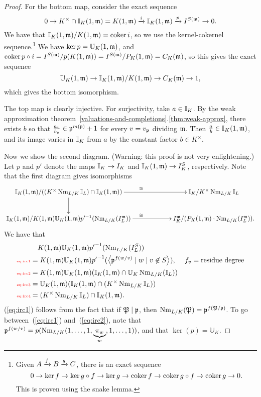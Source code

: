 \begin{proof}
For the bottom map, consider the exact sequence
\[
0\to K^{\times}\cap \mathbb{I}_K(1,{\mathfrak{m}})=K(1,\mathfrak{m})\xrightarrow{i} \mathbb{I}_K(1,{\mathfrak{m}})\xrightarrow{p} I^{S(\mathfrak{m})}\to 0.
\]
We have that $\mathbb{I}_K(1,{\mathfrak{m}})/K(1,\mathfrak{m})=\operatorname{coker} i$, so we use the kernel-cokernel sequence.\footnote{Given $A\xrightarrow{f}B\xrightarrow{g}C$, there is an exact sequence
\[
0\to \ker f\to \ker g\circ f\to \ker g\to \operatorname{coker} f\to \operatorname{coker} g\circ f\to \operatorname{coker} g\to 0.
\]
This is proven using the snake lemma.
}
We have $\ker p=\mathbb U_K(1,\mathfrak{m})$, and $\operatorname{coker} p\circ i=I^{S(\mathfrak{m})}/p(K(1,\mathfrak{m}))=I^{S(\mathfrak{m})}/P_K(1,{\mathfrak{m}})=C_K(\mathfrak{m})$, so this gives the exact sequence  
\[
\mathbb U_K(1,\mathfrak{m})\to  \mathbb{I}_K(1,{\mathfrak{m}})/K(1,{\mathfrak{m}})\to C_K(\mathfrak{m})\to 1,
\]
which gives the bottom isomorphism.

The top map is clearly injective. For surjectivity, take $a\in \mathbb{I}_K$. By the weak approximation theorem~\ref{valuations-and-completions}.\ref{thm:weak-approx}, there exists $b$ so that $\frac{a_v}{b_v}\in \mathfrak{p}^{m(\mathfrak{p})}+1$ for every $v=v_{\mathfrak{p}}$ dividing $\mathfrak{m}$. Then $\frac{a}{b}\in \mathbb{I}_K(1,{\mathfrak{m}})$, and its image varies in $\mathbb{I}_K$ from $a$ by the constant factor $b\in K^{\times}$.

Now we show the second diagram. (Warning: this proof is not very enlightening.) Let $p$ and $p'$ denote the maps $\mathbb{I}_K\to I_K$ and $\mathbb{I}_K(1,\mathfrak{m})\to I_K^S$, respectively. Note that the first diagram gives isomorphisms
\[
\xymatrixcolsep{5pc}
\xymatrix{
\I_K(1,{\mm})/((K^{\times}\nm_{L/K}\I_L)\cap \I_K(1,\mm)) \ar[r]^{\cong} \ar[d]& \I_K/K^{\times}\nm_{L/K}\I_L\\
\I_K(1,{\mm})/
K(1,\mm)\mathbb U_K(1,\mm)
p'^{-1}(\nm_{L/K}(I_L^{\mm}))\ar[r]^{\cong} & I_K^{\mm}/(P_{K}(1,\mm)\cdot \nm_{L/K}(I_L^{\mm})).
}
\]
We have that
\begin{align}
\noindent
&\quad
K(1,{\mm})\mathbb U_K(1,{\mm}){p'}^{-1}(\nm_{L/K}(I_L^{S}))\\
\llabel{eq:irc1}&=
K(1,{\mm})\mathbb U_K(1,{\mm}){p'}^{-1}(\an{\mfp^{f(w/v)}\mid w\mid v\nin S}),&f_v=\text{residue degree}\\
\llabel{eq:irc2}
&=
K(1,{\mm}) \mathbb U_K(1,{\mm})(\I_K(1,{\mm})\cap \mathbb U_K\nm_{L/K}(\I_L))\\
\llabel{eq:irc3}
&=
\mathbb U_K(1,\mm)( \I_K(1,{\mm})\cap(K^{\times}\nm_{L/K}\I_L))\\
\llabel{eq:irc4}
&=
(K^{\times}\nm_{L/K}\I_L)\cap \I_K(1,{\mm}).
\end{align}
(\ref{eq:irc1}) follows from the fact that if $\mathfrak{P}\mid \mathfrak{p}$, then $\operatorname{Nm}_{L/K}(\mathfrak{P})=\mathfrak{p}^{f(\mathfrak{P}/\mathfrak{p})}$. %
To go between~(\ref{eq:irc1}) and~(\ref{eq:irc2}), note that $\mathfrak{p}^{f(w/v)}=p(\operatorname{Nm}_{L/K}(1,\ldots, 1,\underbrace{\pi_w}_w,1,\ldots, 1))$, and that $\ker(p)=\mathbb U_K$. 


\end{proof}
